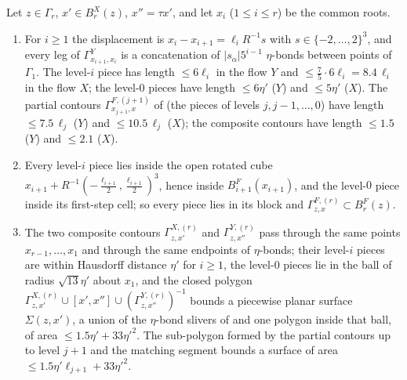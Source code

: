 \begin{lemma}\label{rot:hyb:lem:len}
Let $z\in\Gamma_r$, $x'\in B^X_r(z)$, $x''=\tau x'$, and let $x_i$ ($1\le i\le r$) be the common roots.
\begin{enumerate}[label=\textup{(\roman*)},leftmargin=*]
\item For $i\ge1$ the displacement is $x_i-x_{i+1}=\ell_iR^{-1}s$ with $s\in\{-2,\dots,2\}^3$, and every leg of $\Gamma^Y_{x_{i+1},x_i}$ is a concatenation of $|s_\alpha|5^{i-1}$ $\eta$-bonds between points of $\Gamma_1$. The level-$i$ piece has length $\le6\ell_i$ in the flow $Y$ and $\le\frac75\cdot6\ell_i=8.4\,\ell_i$ in the flow $X$; the level-$0$ pieces have length $\le6\eta'$ ($Y$) and $\le5\eta'$ ($X$). The partial contours $\Gamma^{F,(j+1)}_{x_{j+1},x}$ of \cite[(2.19)]{K1} (the pieces of levels $j,j-1,\dots,0$) have length $\le7.5\,\ell_j$ ($Y$) and $\le10.5\,\ell_j$ ($X$); the composite contours have length $\le1.5$ ($Y$) and $\le2.1$ ($X$).
\item Every level-$i$ piece lies inside the open rotated cube $x_{i+1}+R^{-1}(-\frac{\ell_{i+1}}2,\frac{\ell_{i+1}}2)^3$, hence inside $B^F_{i+1}(x_{i+1})$, and the level-$0$ piece inside its first-step cell; so every piece lies in its block and $\Gamma^{F,(r)}_{z,x}\subset B^F_r(z)$.
\item The two composite contours $\Gamma^{X,(r)}_{z,x'}$ and $\Gamma^{Y,(r)}_{z,x''}$ pass through the same points $x_{r-1},\dots,x_1$ and through the same endpoints of $\eta$-bonds; their level-$i$ pieces are within Hausdorff distance $\eta'$ for $i\ge1$, the level-$0$ pieces lie in the ball of radius $\sqrt{13}\eta'$ about $x_1$, and the closed polygon $\Gamma^{X,(r)}_{z,x'}\cup[x',x'']\cup(\Gamma^{Y,(r)}_{z,x''})^{-1}$ bounds a piecewise planar surface $\Sigma(z,x')$, a union of the $\eta$-bond slivers of  and one polygon inside that ball, of area $\le1.5\eta'+33\eta'^2$. The sub-polygon formed by the partial contours up to level $j+1$ and the matching segment bounds a surface of area $\le1.5\eta'\ell_{j+1}+33\eta'^2$.
\end{enumerate}
\end{lemma}
